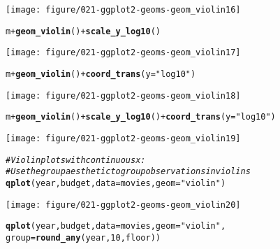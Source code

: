 \documentclass[a4paper,titlepage]{tufte-handout}\usepackage[]{graphicx}\usepackage[]{color}
\makeatletter
\def\maxwidth{ %
  \ifdim\Gin@nat@width>\linewidth
    \linewidth
  \else
    \Gin@nat@width
  \fi
}
\newcommand{\hlnum}[1]{\textcolor[rgb]{0.686,0.059,0.569}{#1}}%
\newcommand{\hlstr}[1]{\textcolor[rgb]{0.192,0.494,0.8}{#1}}%
\newcommand{\hlcom}[1]{\textcolor[rgb]{0.678,0.584,0.686}{\textit{#1}}}%
\newcommand{\hlopt}[1]{\textcolor[rgb]{0,0,0}{#1}}%
\newcommand{\hlstd}[1]{\textcolor[rgb]{0.345,0.345,0.345}{#1}}%
\newcommand{\hlkwc}[1]{\textcolor[rgb]{0.333,0.667,0.333}{#1}}%
\newcommand{\hlkwd}[1]{\textcolor[rgb]{0.737,0.353,0.396}{\textbf{#1}}}%
\newenvironment{kframe}{%
 \def\at@end@of@kframe{}%
 \ifinner\ifhmode%
  \def\at@end@of@kframe{\end{minipage}}%
  \begin{minipage}{\columnwidth}%
 \fi\fi%
 \def\FrameCommand##1{\hskip\@totalleftmargin \hskip-\fboxsep
 \colorbox{shadecolor}{##1}\hskip-\fboxsep
     \hskip-\linewidth \hskip-\@totalleftmargin \hskip\columnwidth}%
 \MakeFramed {\advance\hsize-\width
   \@totalleftmargin\z@ \linewidth\hsize
   \@setminipage}}%
 {\par\unskip\endMakeFramed%
 \at@end@of@kframe}
\newenvironment{knitrout}{}{} %
\makeatother
\begin{document}
\begin{knitrout}
\begin{kframe}
{\ttfamily\noindent\color{warningcolor}{\#\# Warning: position\_dodge requires constant width: output may be incorrect}}\end{kframe}
\texttt{[image: figure/021-ggplot2-geoms-geom\_violin16]} 
\begin{kframe}\begin{alltt}
\hlstd{m} \hlopt{+} \hlkwd{geom_violin}\hlstd{()} \hlopt{+} \hlkwd{scale_y_log10}\hlstd{()}
\end{alltt}


{\ttfamily\noindent\color{warningcolor}{\#\# Warning: position\_dodge requires constant width: output may be incorrect}}\end{kframe}
\texttt{[image: figure/021-ggplot2-geoms-geom\_violin17]} 
\begin{kframe}\begin{alltt}
\hlstd{m} \hlopt{+} \hlkwd{geom_violin}\hlstd{()} \hlopt{+} \hlkwd{coord_trans}\hlstd{(}\hlkwc{y} \hlstd{=} \hlstr{"log10"}\hlstd{)}
\end{alltt}


{\ttfamily\noindent\color{warningcolor}{\#\# Warning: position\_dodge requires constant width: output may be incorrect}}\end{kframe}
\texttt{[image: figure/021-ggplot2-geoms-geom\_violin18]} 
\begin{kframe}\begin{alltt}
\hlstd{m} \hlopt{+} \hlkwd{geom_violin}\hlstd{()} \hlopt{+} \hlkwd{scale_y_log10}\hlstd{()} \hlopt{+} \hlkwd{coord_trans}\hlstd{(}\hlkwc{y} \hlstd{=} \hlstr{"log10"}\hlstd{)}
\end{alltt}


{\ttfamily\noindent\color{warningcolor}{\#\# Warning: position\_dodge requires constant width: output may be incorrect}}\end{kframe}
\texttt{[image: figure/021-ggplot2-geoms-geom\_violin19]} 
\begin{kframe}\begin{alltt}
\hlcom{# Violin plots with continuous x:}
\hlcom{# Use the group aesthetic to group observations in violins}
\hlkwd{qplot}\hlstd{(year, budget,} \hlkwc{data} \hlstd{= movies,} \hlkwc{geom} \hlstd{=} \hlstr{"violin"}\hlstd{)}
\end{alltt}


{\ttfamily\noindent\color{warningcolor}{\#\# Warning: Removed 53573 rows containing non-finite values (stat\_ydensity).}}\end{kframe}
\texttt{[image: figure/021-ggplot2-geoms-geom\_violin20]} 
\begin{kframe}\begin{alltt}
\hlkwd{qplot}\hlstd{(year, budget,} \hlkwc{data} \hlstd{= movies,} \hlkwc{geom} \hlstd{=} \hlstr{"violin"}\hlstd{,}
  \hlkwc{group} \hlstd{=} \hlkwd{round_any}\hlstd{(year,} \hlnum{10}\hlstd{, floor))}
\end{alltt}



\end{kframe}
\end{knitrout}
\end{document}
